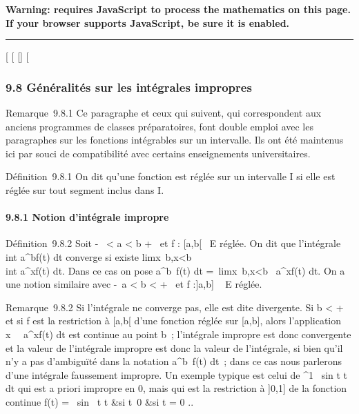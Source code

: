 \textbf{Warning: 
requires JavaScript to process the mathematics on this page.\\ If your
browser supports JavaScript, be sure it is enabled.}

\begin{center}\rule{3in}{0.4pt}\end{center}

{[}
{[}
{[}{]}
{[}

\subsubsection{9.8 Généralités sur les intégrales impropres}

Remarque~9.8.1 Ce paragraphe et ceux qui suivent, qui correspondent aux
anciens programmes de classes préparatoires, font double emploi avec les
paragraphes sur les fonctions intégrables sur un intervalle. Ils ont été
maintenus ici par souci de compatibilité avec certains enseignements
universitaires.

Définition~9.8.1 On dit qu'une fonction est réglée sur un intervalle I
si elle est réglée sur tout segment inclus dans I.

\paragraph{9.8.1 Notion d'intégrale impropre}

Définition~9.8.2 Soit -\infty~ \textless{} a \textless{} b \leq +\infty~ et f :
{[}a,b{[}\rightarrow~ E réglée. On dit que l'intégrale \\int
 a^bf(t) dt converge si existe
limx\rightarrow~b,x\textless{}b~\\int
 a^xf(t) dt. Dans ce cas on pose
\int  a^b~f(t) dt
=\
limx\rightarrow~b,x\textless{}b\int ~
a^xf(t) dt. On a une notion similaire avec -\infty~\leq a
\textless{} b \textless{} +\infty~ et f :{]}a,b{]} \rightarrow~ E réglée.

Remarque~9.8.2 Si l'intégrale ne converge pas, elle est dite divergente.
Si b \textless{} +\infty~ et si f est la restriction à {[}a,b{[} d'une
fonction réglée sur {[}a,b{]}, alors l'application
x\mapsto~\int ~
a^xf(t) dt est continue au point b~; l'intégrale impropre
est donc convergente et la valeur de l'intégrale impropre est donc la
valeur de l'intégrale, si bien qu'il n'y a pas d'ambiguïté dans la
notation \int  a^b~f(t) dt~; dans
ce cas nous parlerons d'une intégrale faussement impropre. Un exemple
typique est celui de \int  0^1~
sin t \over t~ dt qui est a
priori impropre en 0, mais qui est la restriction à {]}0,1{]} de la
fonction continue f(t) = \left \
\cases  sin~ t
\over t &si t\neq~0
 &si t = 0 \cr 
\right ..

